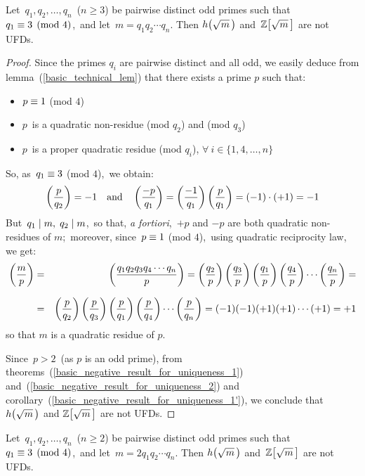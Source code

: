 \begin{thm}\label{deeper_4}
Let \,$q_1, q_2, \ldots, q_n$\, ($n \geq 3$)
be pairwise distinct odd primes such that\, $q_1 \equiv 3 \pmod 4$,\,
and let\, $m = q_1 q_2 \cdots q_n$.
Then $\hh{m}$ and \,$\ZZ{m}$ are not UFDs.
\end{thm}

\begin{proof}
%
Since the primes $q_i$ are pairwise distinct and all odd,
we easily deduce from lemma~(\ref{basic_technical_lem})
that there exists a prime $p$ such that:

\begin{itemize}

\item $p \equiv 1$ (mod $4$)

\item $p$\, is a quadratic non-residue
(mod $q_2$) and (mod $q_3$)

\item $p$\, is a proper quadratic residue (mod $q_i$),
$\forall\: i \in \{1, 4, \ldots, n\}$

\end{itemize}

So, as\, $q_1 \equiv 3$ (mod $4$),\, we obtain:
$$
\left(\frac{p}{q_2}\right) = -1 \quad \textrm{and} \quad
\left(\frac{-p}{q_1}\right) = \left(\frac{-1}{q_1}\right) \left(\frac{p}{q_1}\right)
= (-1) \cdot (+1) = -1
$$
But \,$q_1 \mid m,\; q_2 \mid m$,\, so
that, \emph{a fortiori},\, $+p$ and $-p$ are
both quadratic non-residues of $m$;\, moreover,
since\, $p \equiv 1$ (mod $4$),\, using
quadratic reciprocity law, we get:
%
{\setlength\arraycolsep{2pt}
\begin{eqnarray*}
\left(\frac{m}{p}\right) & = &\left(\frac{q_1 q_2 q_3 q_4 \cdots q_n}{p}\right) =
\left(\frac{q_2}{p}\right) \left(\frac{q_3}{p}\right) \left(\frac{q_1}{p}\right) \left(\frac{q_4}{p}\right)
\cdots \left(\frac{q_n}{p}\right) = \\[7pt]
& = & \left(\frac{p}{q_2}\right) \left(\frac{p}{q_3}\right) \left(\frac{p}{q_1}\right) \left(\frac{p}{q_4}\right)
\cdots \left(\frac{p}{q_n}\right) = (-1)(-1)(+1)(+1)\cdots(+1) = +1
\end{eqnarray*}}
{\flushleft
so that $m$ is a quadratic residue of $p$.}

Since\, $p > 2$\, (as $p$ is an odd prime), from
theorems~(\ref{basic_negative_result_for_uniqueness_1})
and~(\ref{basic_negative_result_for_uniqueness_2})
and corollary~(\ref{basic_negative_result_for_uniqueness_1'}),
we conclude that $\hh{m}$ and $\ZZ{m}$
are not UFDs.
%
\end{proof}


\begin{thm}\label{deeper_5}
Let \,$q_1, q_2, \ldots, q_n$\, ($n \geq 2$)
be pairwise distinct odd primes such that\, $q_1 \equiv 3 \pmod 4$,\,
and let\, $m = 2 q_1 q_2 \cdots q_n$. 
Then $\hh{m}$ and \,$\ZZ{m}$ are not UFDs.
\end{thm}

